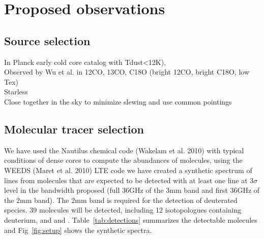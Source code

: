 \section{Proposed observations}
\subsection{Source selection}
  In Planck early cold core catalog with Tdust<12K),\\
  Observed by Wu et al. in 12CO, 13CO, C18O (bright 12CO, bright C18O, low Tex)\\
  Starless\\
  Close together in the sky to minimize slewing and use common pointings
\subsection{Molecular tracer selection}
  We have used the Nautilus chemical code (Wakelam et al. 2010) with typical conditions of dense cores to compute the abundances of molecules, using the WEEDS (Maret et al. 2010) LTE code we have created a synthetic spectrum of lines from molecules that are expected to be detected with at least one line at 3$\sigma$ level in the bandwidth proposed (full 36GHz of the 3mm band and first 36GHz of the 2mm band). The 2mm band is required for the detection of deuterated species. 39 molecules will be detected, including 12 isotopologues containing deuterium,  and  and . Table~\ref{tab:detections} summarizes the detectable molecules and Fig~\ref{fig:setup} shows the synthetic spectra.
  

  
  
  
  
  
  
  
  
  